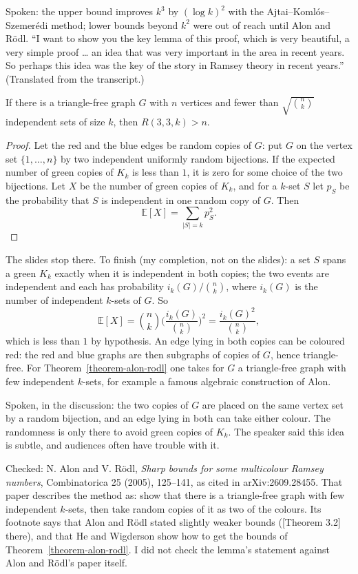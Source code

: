 \noindent
Spoken: the upper bound improves $k^3$ by
$(\log k)^2$ with the
Ajtai--Koml\'os--Szemer\'edi method; lower
bounds beyond $k^2$ were out of reach until
Alon and R\"odl. ``I want to show you the key
lemma of this proof, which is very beautiful,
a very simple proof \ldots{} an idea that was
very important in the area in recent years.
So perhaps this idea was the key of the
story in Ramsey theory in recent years.''
(Translated from the transcript.)

\begin{lemma}
\label{lemma-alon-rodl}
If there is a triangle-free graph $G$ with
$n$ vertices and fewer than
$\sqrt{\binom{n}{k}}$ independent sets of
size $k$, then $R(3,3,k) > n$.
\end{lemma}

\begin{proof}
Let the red and the blue edges be random
copies of $G$: put $G$ on the vertex set
$\{1,\ldots,n\}$ by two independent uniformly
random bijections. If the expected number of
green copies of $K_k$ is less than $1$, it is
zero for some choice of the two bijections.
Let $X$ be the number of green copies of
$K_k$, and for a $k$-set $S$ let $p_S$ be
the probability that $S$ is independent in
one random copy of $G$. Then
$$
\mathbb{E}[X]
= \sum_{|S| = k} p_S^2.
$$
\end{proof}

\noindent
The slides stop there. To finish (my
completion, not on the slides): a set $S$
spans a green $K_k$ exactly when it is
independent in both copies; the two events
are independent and each has probability
$i_k(G)/\binom{n}{k}$, where $i_k(G)$ is the
number of independent $k$-sets of $G$. So
$$
\mathbb{E}[X]
= \binom{n}{k}
\Big(\frac{i_k(G)}{\binom{n}{k}}\Big)^2
= \frac{i_k(G)^2}{\binom{n}{k}},
$$
which is less than $1$ by hypothesis. An
edge lying in both copies can be coloured
red: the red and blue graphs are then
subgraphs of copies of $G$, hence
triangle-free. For
Theorem~\ref{theorem-alon-rodl} one takes for
$G$ a triangle-free graph with few
independent $k$-sets, for example a famous
algebraic construction of Alon.

Spoken, in the discussion: the two copies of
$G$ are placed on the same vertex set by a
random bijection, and an edge lying in both
can take either colour. The randomness is
only there to avoid green copies of $K_k$.
The speaker said this idea is subtle, and
audiences often have trouble with it.

\begin{remark}
\label{remark-alon-rodl-reference}
Checked: N. Alon and V. R\"odl, \emph{Sharp
bounds for some multicolour Ramsey numbers},
Combinatorica 25 (2005), 125--141, as cited
in arXiv:2609.28455. That paper describes
the method as: show that there is a
triangle-free graph with few independent
$k$-sets, then take random copies of it as
two of the colours. Its footnote says that
Alon and R\"odl stated slightly weaker
bounds ([Theorem 3.2] there), and that He
and Wigderson show how to get the bounds of
Theorem~\ref{theorem-alon-rodl}. I did not
check the lemma's statement against Alon and
R\"odl's paper itself.
\end{remark}

